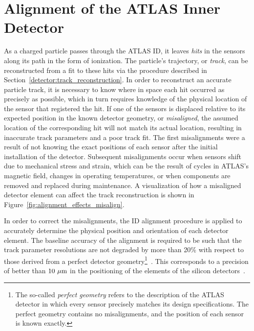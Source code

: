 \chapter[Alignment of the ATLAS Inner Detector][Alignment of the ATLAS Inner Detector]{Alignment of the ATLAS Inner Detector}
\label{ch:alignment}

As a charged particle passes through the ATLAS ID, it leaves \emph{hits} in the sensors along its path in the form of ionization.
The particle's trajectory, or \emph{track}, can be reconstructed from a fit to these hits via the procedure described in Section~\ref{detector:track_reconstruction}.
In order to reconstruct an accurate particle track, it is necessary to know where in space each hit occurred as precisely as possible, which in turn requires knowledge of the physical location of the sensor that registered the hit.
If one of the sensors is displaced relative to its expected position in the known detector geometry, or \emph{misaligned}, the assumed location of the corresponding hit will not match its actual location, resulting in inaccurate track parameters and a poor track fit.
The first misalignments were a result of not knowing the exact positions of each sensor after the initial installation of the detector.
Subsequent misalignments occur when sensors shift due to mechanical stress and strain, which can be the result of cycles in ATLAS's magnetic field, changes in operating temperatures, or when components are removed and replaced during maintenance.
A visualization of how a misaligned detector element can affect the track reconstruction is shown in Figure~\ref{fig:alignment_effects_misalign}. %

In order to correct the misalignments, the ID alignment procedure is applied to accurately determine the physical position and orientation of each detector element.
The baseline accuracy of the alignment is required to be such that the track parameter resolutions are not degraded by more than 20\% with respect to those derived from a perfect detector geometry\footnote{The so-called \emph{perfect geometry} refers to the description of the ATLAS detector in which every sensor precisely matches its design specifications.  The perfect geometry contains no misalignments, and the position of each sensor is known exactly.}~\cite{1997.id-tdr-1}.
This corresponds to a precision of better than $10~\mu\textrm{m}$ in the positioning of the elements of the silicon detectors~\cite{2011.alignment-7tev}.

